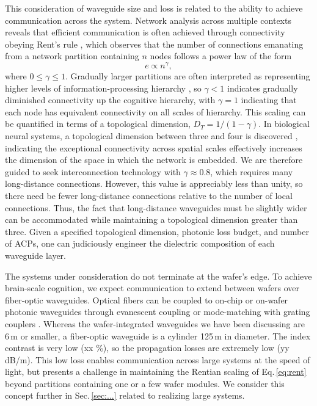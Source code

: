 \documentclass[twocolumn]{article}
\begin{document}
This consideration of waveguide size and loss is related to the ability to achieve communication across the system. Network analysis across multiple contexts reveals that efficient communication is often achieved through connectivity obeying Rent's rule \cite{}, which observes that the number of connections emanating from a network partition containing $n$ nodes follows a power law of the form
\begin{equation}
\label{eq:rent}
e\propto n^\gamma,
\end{equation} 
where $0 \le \gamma \le 1$. Gradually larger partitions are often interpreted as representing higher levels of information-processing hierarchy \cite{}, so $\gamma < 1$ indicates gradually diminished connectivity up the cognitive hierarchy, with $\gamma = 1$ indicating that each node has equivalent connectivity on all scales of hierarchy. This scaling can be quantified in terms of a topological dimension, $D_T = 1/(1-\gamma)$. In biological neural systems, a topological dimension between three and four is discovered \cite{}, indicating the exceptional connectivity across spatial scales effectively increases the dimension of the space in which the network is embedded. We are therefore guided to seek interconnection technology with $\gamma \approx 0.8$, which requires many long-distance connections. However, this value is appreciably less than unity, so there need be fewer long-distance connections relative to the number of local connections. Thus, the fact that long-distance waveguides must be slightly wider can be accommodated while maintaining a topological dimension greater than three. Given a specified topological dimension, photonic loss budget, and number of ACPs, one can judiciously engineer the dielectric composition of each waveguide layer. 

The systems under consideration do not terminate at the wafer's edge. To achieve brain-scale cognition, we expect communication to extend between wafers over fiber-optic waveguides. Optical fibers can be coupled to on-chip or on-wafer photonic waveguides through evanescent coupling \cite{} or mode-matching with grating couplers \cite{}. Whereas the wafer-integrated waveguides we have been discussing are 6\,\textmu m or smaller, a fiber-optic waveguide is a cylinder 125\,\textmu m in diameter. The index contrast is very low (xx \%), so the propagation losses are extremely low (yy dB/m). This low loss enables communication across large systems at the speed of light, but presents a challenge in maintaining the Rentian scaling of Eq.\,\ref{eq:rent} beyond partitions containing one or a few wafer modules. We consider this concept further in Sec.\,\ref{sec:...} related to realizing large systems.
\end{document}
